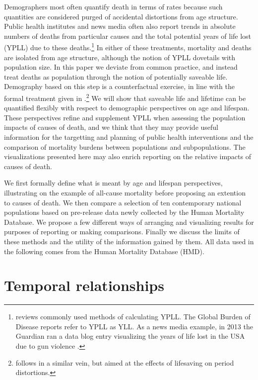 \documentclass{article}
\begin{document}
Demographers most often quantify death in terms of rates 
because such quantities are considered purged of accidental distortions from
age structure. Public health institutes and news media often also report trends
in absolute numbers of deaths from particular causes and the total potential years of life lost (YPLL) due to
these deaths.\footnote{\citet{gardner1990} reviews commonly used methods of
calculating YPLL. The Global Burden of Disease reports refer to YPLL as YLL.
As a news media example, in 2013 the Guardian ran a data blog entry
visualizing the years of life lost in the USA due to gun violence
\citep{rogers2013gun}. } In either of these treatments, mortality and deaths are
isolated from age structure, although the notion of YPLL dovetails with
population size. In this paper we deviate from common practice, and
instead treat deaths as population through the notion of potentially saveable
life. Demography based on this step is a counterfactual exercise, in
line with the formal treatment given in
\citet{vaupel1987repeated}.\footnote{\citet{vaupel2008lifesaving} follows in a
similar vein, but aimed at the effects of lifesaving on period distortions.} We
will show that saveable life and lifetime can be quantified flexibly with respect to demographic perspectives on age and lifespan. These perspectives refine and supplement YPLL when assessing the population impacts of causes of death, and we
think that they may provide useful information for the targetting and planning
of public health interventions and the comparison of mortality burdens between
populations and subpopulations. The visualizations presented here may also
enrich reporting on the relative impacts of causes of death.

We first formally define what is meant by age and lifespan
perspectives, illustrating on the example of all-cause
mortality before proposing an extention to causes of death. We then compare a selection of ten
contemporary national populations based on pre-release data newly collected by
the Human Mortality Database. We propose a few different ways
of arranging and visualizing results for purposes of reporting or making
comparisons. Finally we discuss the limits of these methods and the
utility of the information gained by them. All data used in the following comes
from the Human Mortality Database (HMD).

\section*{Temporal relationships}
\end{document}

